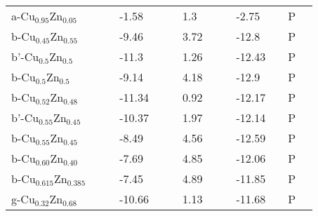 \documentclass{article}
\begin{document}
\begin{center}
\begin{longtable}{|l|p{2.5cm}|l|p{2.5cm}|l|l|p{2.5cm}|l|l|p{2.5cm}|l|l|l|}
a-Cu$_{0.95}$Zn$_{0.05 }$   &            &                     & -1.58   &  & \citep{KubaschewskiCatterallJohnAshley.1956} & 1.3    &  & \citep{KubaschewskiCatterallJohnAshley.1956} & -2.75   &  & P                    \\
b-Cu$_{0.45}$Zn$_{0.55 }$   &            &                     & -9.46   &  & \citep{KubaschewskiCatterallJohnAshley.1956} & 3.72   &  & \citep{KubaschewskiCatterallJohnAshley.1956} & -12.8   &  & P                    \\
b'-Cu$_{0.5}$Zn$_{0.5 }$    &            &                     & -11.3   &  & \citep{KubaschewskiCatterallJohnAshley.1956} & 1.26   &  & \citep{KubaschewskiCatterallJohnAshley.1956} & -12.43  &  & P                    \\
b-Cu$_{0.5}$Zn$_{0.5 }$     &            &                     & -9.14   &  & \citep{KubaschewskiCatterallJohnAshley.1956} & 4.18   &  & \citep{KubaschewskiCatterallJohnAshley.1956} & -12.9   &  & P                    \\
b-Cu$_{0.52}$Zn$_{0.48 }$   &            &                     & -11.34  &  & \citep{KubaschewskiCatterallJohnAshley.1956} & 0.92   &  & \citep{KubaschewskiCatterallJohnAshley.1956} & -12.17  &  & P                    \\
b'-Cu$_{0.55}$Zn$_{0.45}$   &            &                     & -10.37  &  & \citep{KubaschewskiCatterallJohnAshley.1956} & 1.97   &  & \citep{KubaschewskiCatterallJohnAshley.1956} & -12.14  &  & P                    \\
b-Cu$_{0.55}$Zn$_{0.45 }$   &            &                     & -8.49   &  & \citep{KubaschewskiCatterallJohnAshley.1956} & 4.56   &  & \citep{KubaschewskiCatterallJohnAshley.1956} & -12.59  &  & P                    \\
b-Cu$_{0.60}$Zn$_{0.40}$    &            &                     & -7.69   &  & \citep{KubaschewskiCatterallJohnAshley.1956} & 4.85   &  & \citep{KubaschewskiCatterallJohnAshley.1956} & -12.06  &  & P                    \\
b-Cu$_{0.615}$Zn$_{0.385 }$ &            &                     & -7.45   &  & \citep{KubaschewskiCatterallJohnAshley.1956} & 4.89   &  & \citep{KubaschewskiCatterallJohnAshley.1956} & -11.85  &  & P                    \\
g-Cu$_{0.32}$Zn$_{0.68}$    &            &                     & -10.66  &  & \citep{KubaschewskiCatterallJohnAshley.1956} & 1.13   &  & \citep{KubaschewskiCatterallJohnAshley.1956} & -11.68  &  & P                    \\

\end{longtable}
\end{center}
\end{document}
